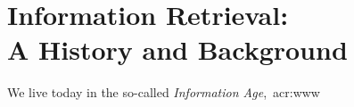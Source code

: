 
\chapter[Information Retrieval]{Information Retrieval:\\A History and Background}\label{chap:ir_background}
We live today in the so-called \emph{Information Age},~\gls{acr:www}